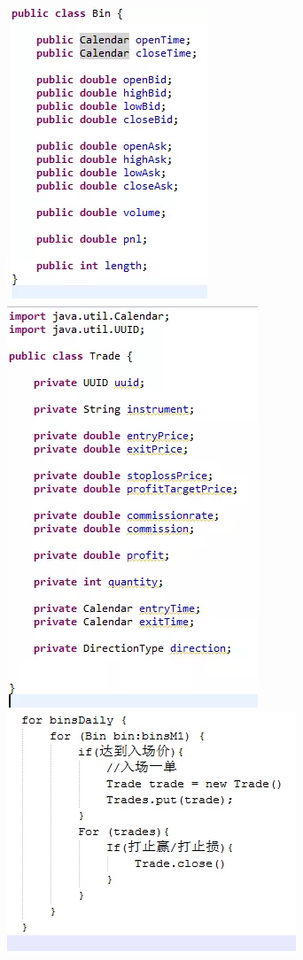\documentclass[11pt, openany]{book}              %
\begin{document}
\includegraphics[scale=0.5]{4.JPG}
\includegraphics[scale=0.5]{5.JPG}
\includegraphics[scale=0.5]{6.JPG}
\end{document}

